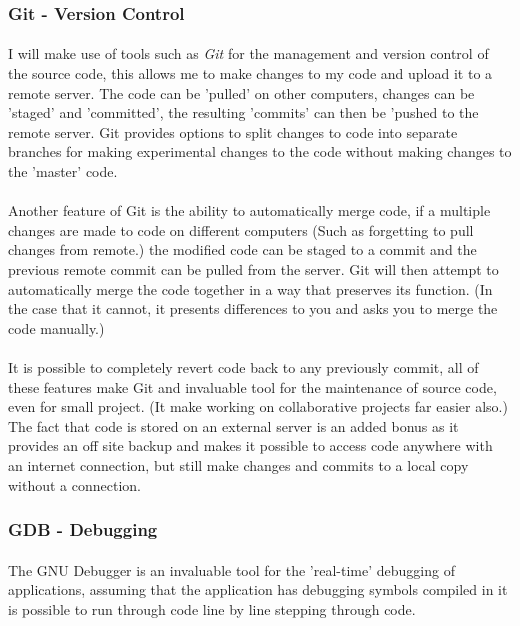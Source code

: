 \subsubsection{Git - Version Control}
\paragraph{}
I will make use of tools such as \textit{Git} for the management and version control of the source code, this allows me to make changes to my code and upload it to a remote server. The code can be 'pulled' on other computers, changes can be 'staged' and 'committed', the resulting 'commits' can then be 'pushed to the remote server. Git provides options to split changes to code into separate branches for making experimental changes to the code without making changes to the 'master' code.

\paragraph{}
Another feature of Git is the ability to automatically merge code, if a multiple changes are made to code on different computers (Such as forgetting to pull changes from remote.) the modified code can be staged to a commit and the previous remote commit can be pulled from the server. Git will then attempt to automatically merge the code together in a way that preserves its function. (In the case that it cannot, it presents differences to you and asks you to merge the code manually.)

\paragraph{}
It is possible to completely revert code back to any previously commit, all of these features make Git and invaluable tool for the maintenance of source code, even for small project. (It make working on collaborative projects far easier also.) The fact that code is stored on an external server is an added bonus as it provides an off site backup and makes it possible to access code anywhere with an internet connection, but still make changes and commits to a local copy without a connection.

\subsubsection{GDB - Debugging}
\paragraph{}
The GNU Debugger is an invaluable tool for the 'real-time' debugging of applications, assuming that the application has debugging symbols compiled in it is possible to run through code line by line stepping through code.

